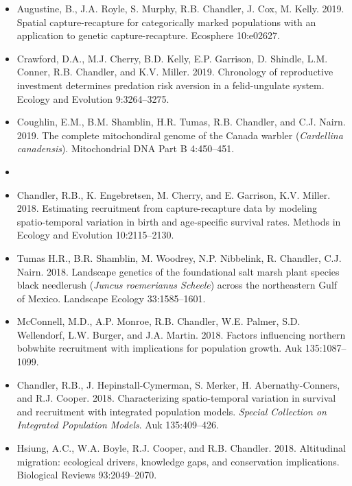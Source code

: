 \documentclass[12pt]{article}
\begin{document}
\begin{itemize}
\item Augustine, B., J.A. Royle, S. Murphy, R.B. Chandler,
  J. Cox, M. Kelly. 2019. Spatial capture-recapture for
  categorically marked populations with an application to genetic
  capture-recapture. Ecosphere 10:e02627.

\item Crawford, D.A., M.J. Cherry, B.D. Kelly, E.P. Garrison,
  D. Shindle, L.M. Conner, R.B. Chandler, and
  K.V. Miller. 2019. Chronology of reproductive investment determines
  predation risk aversion in a felid-ungulate system. Ecology and
  Evolution 9:3264--3275. 

\item Coughlin, E.M., B.M. Shamblin, H.R. Tumas, R.B. Chandler, and
  C.J. Nairn. 2019. The complete mitochondiral genome of the
  Canada warbler ({\it Cardellina canadensis}). Mitochondrial DNA Part
  B 4:450--451.

  
\item[] { \\}

\item Chandler, R.B., K. Engebretsen, M. Cherry, and E. Garrison, 
  K.V. Miller. 2018. Estimating recruitment from
  capture-recapture data by modeling spatio-temporal variation in
  birth and age-specific survival rates. Methods in Ecology and
  Evolution 10:2115--2130.

\item Tumas H.R., B.R. Shamblin, M. Woodrey, N.P. Nibbelink,
  R. Chandler, C.J. Nairn. 2018. Landscape genetics of the
  foundational salt marsh plant species black needlerush ({\it Juncus
    roemerianus Scheele}) across the northeastern Gulf of
  Mexico. Landscape Ecology 33:1585--1601.
  
\item McConnell, M.D., A.P. Monroe, R.B. Chandler, W.E. Palmer,
  S.D. Wellendorf, L.W. Burger, and J.A. Martin. 2018. Factors
  influencing northern bobwhite recruitment with implications for
  population growth. Auk 135:1087--1099.
  
\item Chandler, R.B., J. Hepinstall-Cymerman, S. Merker, H. Abernathy-Conners,
  and R.J. Cooper. 2018. Characterizing spatio-temporal 
  variation in survival and recruitment with integrated population
  models. {\it Special Collection on Integrated Population
    Models}. Auk 135:409--426. 

\item Hsiung, A.C., W.A. Boyle, R.J. Cooper, and
  R.B. Chandler. 2018. Altitudinal migration: ecological drivers,
  knowledge gaps, and conservation implications. Biological Reviews 
  93:2049--2070. 


\end{itemize}
\end{document}
